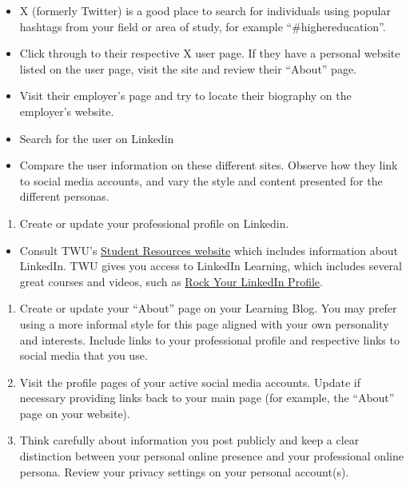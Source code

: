 \documentclass[
]{book}
\providecommand{\tightlist}{%
  \setlength{\itemsep}{0pt}\setlength{\parskip}{0pt}}
\theoremstyle{definition}
\theoremstyle{definition}
\theoremstyle{definition}
\theoremstyle{definition}
\theoremstyle{remark}
\begin{document}
\begin{reflect}
\begin{itemize}
\tightlist
\item
  X (formerly Twitter) is a good place to search for individuals using popular hashtags from your field or area of study, for example ``\#highereducation''.\\
\item
  Click through to their respective X user page. If they have a personal website listed on the user page, visit the site and review their ``About'' page.\\
\item
  Visit their employer's page and try to locate their biography on the employer's website.\\
\item
  Search for the user on Linkedin\\
\item
  Compare the user information on these different sites. Observe how they link to social media accounts, and vary the style and content presented for the different personas.
\end{itemize}

\begin{enumerate}
\def\labelenumi{\arabic{enumi}.}
\setcounter{enumi}{3}
\tightlist
\item
  Create or update your professional profile on Linkedin.
\end{enumerate}

\begin{itemize}
\tightlist
\item
  Consult TWU's \href{https://www.twu.ca/academics/academic-professional-support/centre-calling-career-development/students/student}{Student Resources website} which includes information about LinkedIn. TWU gives you access to LinkedIn Learning, which includes several great courses and videos, such as \href{https://www.linkedin.com/learning/rock-your-linkedin-profile/connect-to-opportunity-with-linkedin?u=124451074}{Rock Your LinkedIn Profile}.
\end{itemize}

\begin{enumerate}
\def\labelenumi{\arabic{enumi}.}
\setcounter{enumi}{4}
\item
  Create or update your ``About'' page on your Learning Blog. You may prefer using a more informal style for this page aligned with your own personality and interests. Include links to your professional profile and respective links to social media that you use.
\item
  Visit the profile pages of your active social media accounts. Update if necessary providing links back to your main page (for example, the ``About'' page on your website).
\item
  Think carefully about information you post publicly and keep a clear distinction between your personal online presence and your professional online persona. Review your privacy settings on your personal account(s).
\end{enumerate}
\end{reflect}
\end{document}
